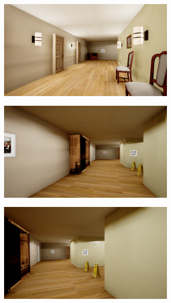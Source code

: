 \begin{figure}[H]
    \centering
    \begin{subfigure}{0.32\textwidth}
        \centering
        \includegraphics[width=\textwidth]{resources/png/06/vanishing-point/evaluation/0.png}
        \vspace{0.5em}
    \end{subfigure}
    \hfill
    \begin{subfigure}{0.32\textwidth}
        \centering
        \includegraphics[width=\textwidth]{resources/png/06/vanishing-point/evaluation/1.png}
        \vspace{0.5em}
    \end{subfigure}
    \hfill
    \begin{subfigure}{0.32\textwidth}
        \centering
        \includegraphics[width=\textwidth]{resources/png/06/vanishing-point/evaluation/2.png}

\end{subfigure}
\end{figure}
